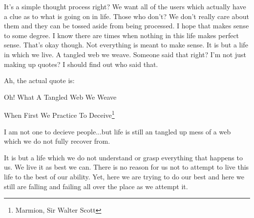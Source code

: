 

It's a simple thought process right? We want all of the users which actually
have a clue as to what is going on in life. Those who don't? We don't really
care about them and they can be tossed aside from being processed. I hope that
makes sense to some degree. I know there are times when nothing in this life
makes perfect sense. That's okay though. Not everything is meant to make sense.
It is but a life in which we live. A tangled web we weave. Someone said that
right? I'm not just making up quotes? I should find out who said that.

Ah, the actual quote is:

\begin{displayquote}
Oh! What A Tangled Web We Weave 

When First We Practice To Deceive\footnote{Marmion, Sir Walter Scott}
\end{displayquote}

I am not one to decieve people...but life is still an tangled up mess of a web
which we do not fully recover from.

It is but a life which we do not understand or grasp everything that happens to
us. We live it as best we can. There is no reason for us not to attempt to live
this life to the best of our ability. Yet, here we are trying to do our best and
here we still are falling and failing all over the place as we attempt it.
